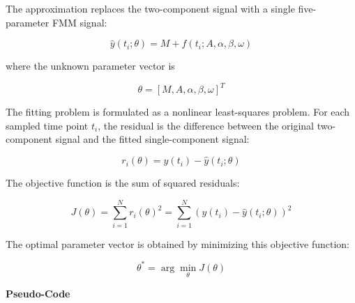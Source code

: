 \documentclass{book}
\providecommand{\ProjectDeepHeading}[2]{%
    \par\medskip\noindent\textbf{#2}\par\smallskip
}
\begin{document}
        The approximation replaces the two-component signal with a single five-parameter FMM signal:
        
        \[
            \hat{y}(t_i; \ensuremath{\theta})
            =
            M
            +
            f(t_i; A,\ensuremath{\alpha},\ensuremath{\beta},\ensuremath{\omega})
        \]
        
        where the unknown parameter vector is
        
        \[
            \ensuremath{\theta}
            =
            \left[
                M,
                A,
                \ensuremath{\alpha},
                \ensuremath{\beta},
                \ensuremath{\omega}
            \right]^{T}
        \]
        
        The fitting problem is formulated as a nonlinear least-squares problem. For each sampled time point \(t_i\), the residual is the difference between the original two-component signal and the fitted single-component signal:
        
        \[
            r_i(\ensuremath{\theta})
            =
            y(t_i)
            -
            \hat{y}(t_i; \ensuremath{\theta})
        \]
        
        The objective function is the sum of squared residuals:
        
        \[
            J(\ensuremath{\theta})
            =
            \sum_{i=1}^{N}
            r_i(\ensuremath{\theta})^2
            =
            \sum_{i=1}^{N}
            \left(
                y(t_i)
                -
                \hat{y}(t_i; \ensuremath{\theta})
            \right)^2
        \]
        
        The optimal parameter vector is obtained by minimizing this objective function:
        
        \[
            \ensuremath{\theta}^{*}
            =
            \arg\min_{\ensuremath{\theta}}
            J(\ensuremath{\theta})
        \]
    
    
    \ProjectDeepHeading{10}{Pseudo-Code}
        
\end{document}

